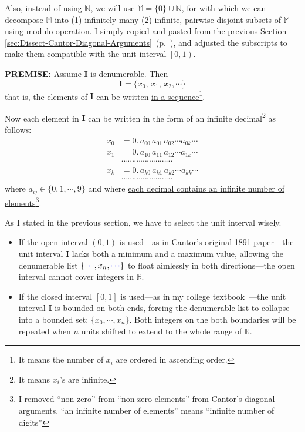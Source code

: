 \documentclass[12pt]{article}
\theoremstyle{definition} %
\numberwithin{equation}{section}
\newcommand{\customref}[2]{\ref{#1:#2} \,\nameref{#1:#2}(p.~\pageref{#1:#2})}
\begin{document}
\vspace{1em}
Also, instead of using \(\mathbb{N}\), we will use \(\mathbb{M} = \{0\} \cup \mathbb{N}\), for with which we can decompose \(\mathbb{M}\) into (1) infinitely many (2) infinite, pairwise disjoint subsets of \(\mathbb{M}\) using modulo operation. I simply copied and pasted from the previous Section \customref{sec}{Dissect-Cantor-Diagonal-Arguments}, and adjusted the subscripts to make them compatible with the unit interval \(\left[0, 1\right)\).


\vspace{1em}
\textbf{PREMISE:} Assume \(\bm{I}\) is denumerable. Then
\[
	\bm{I} = \{x_0,\, x_1,\, x_2, \cdots\}
\]
that is, the elements of \(\bm{I}\) can be written \underline{in a sequence}\footnote{It means the number of \(x_i\) are ordered in ascending order.}.

\vspace{1em}
Now each element in \(\bm{I}\) can be written \underline{in the form of an infinite decimal}\footnote{It means \(x_i\)'s are infinite.} as follows:
\begin{align}
x_0 &= 0.\,a_{00}\,a_{01}\,a_{02} \cdots a_{0k}\cdots \\
x_1 &= 0.\,a_{10}\,a_{11}\,a_{12} \cdots a_{1k}\cdots \\
&\cdots \cdots \cdots \cdots \cdots \cdots \cdots \cdots  \nonumber\\
x_k &= 0.\,a_{k0}\,a_{k1}\,a_{k2} \cdots a_{kk}\cdots \label{eq:xk-interval}\\
&\cdots \cdots \cdots \cdots \cdots \cdots \cdots \cdots  \nonumber
\end{align}
where \(a_{ij} \in \{0, 1, \cdots, 9\}\) and where \underline{each decimal contains an infinite number of elements}\footnote{I removed ``non-zero'' from ``non-zero elements'' from Cantor's diagonal arguments. ``an infinite number of elements'' means ``infinite number of digits''}.

\vspace{1em}
\noindent As I stated in the previous section, we have to select the unit interval wisely. 

\begin{itemize}
\item If the open interval \(\left(0, 1\right)\) is used—as in Cantor’s original 1891 paper—the unit interval \(\bm{I}\) lacks both a minimum and a maximum value, allowing the denumerable list \(\{\textcolor{blue}{\cdots}, x_n, \textcolor{blue}{\cdots} \}\) to float aimlessly in both directions—the open interval cannot cover integers in \(\mathbb{R}\).

\item If the closed interval \(\left[0, 1\right]\) is used—as in my college textbook~\cite{lipschutz1998}—the unit interval \(\bm{I}\) is bounded on both ends, forcing the denumerable list to collapse into a bounded set: \(\{x_0,\cdots, x_n\}\). Both integers on the both boundaries will be repeated when \(n\) units shifted to extend to the whole range of \(\mathbb{R}\). 
\end{itemize}
\end{document}
